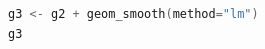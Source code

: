 \begin{lstlisting}[language=c++,label={code:05_12},caption={Fitting linear model}]
g3 <- g2 + geom_smooth(method="lm")
g3
\end{lstlisting}
